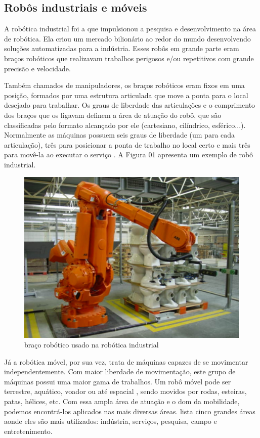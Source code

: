 \subsection{Robôs industriais e móveis}

A robótica industrial foi a que impulsionou a pesquisa e desenvolvimento na área de robótica. Ela criou um mercado bilionário ao redor do mundo desenvolvendo soluções automatizadas para a indústria. Esses robôs em grande parte eram braços robóticos que realizavam trabalhos perigosos e/ou repetitivos com grande precisão e velocidade. 

Também chamados de manipuladores, os braços robóticos eram fixos em uma posição, formados por uma estrutura articulada que move a ponta para o local desejado para trabalhar. Os graus de liberdade das articulações e o comprimento dos braços que os ligavam definem a área de atuação do robô, que são classificadas pelo formato alcançado por ele (cartesiano, cilíndrico, esférico...). Normalmente as máquinas possuem seis graus de liberdade (um para cada articulação), três para posicionar a ponta de trabalho no local certo e mais três para movê-la ao executar o serviço \cite{Abreu2001}. A Figura 01 apresenta um exemplo de robô industrial.

\begin{figure}[h]
	\centering
	\label{fig01}
		\includegraphics[keepaspectratio=true,scale=0.6]{figuras/1bracorobotico.jpg}
	\caption{braço robótico usado na robótica industrial \cite{IMG_ROB_IND_SITE}}
\end{figure}

Já a robótica móvel, por sua vez, trata de máquinas capazes de se movimentar independentemente. Com maior liberdade de movimentação, este grupo de máquinas possui uma maior gama de trabalhos. Um robô móvel pode ser terrestre, aquático, voador ou até espacial \cite{Vieira2005}, sendo movidos por rodas, esteiras, patas, hélices, etc. Com essa ampla área de atuação e o dom da mobilidade, podemos encontrá-los aplicados nas mais diversas áreas. \cite{Pereira2003} lista cinco grandes áreas aonde eles são mais utilizados: indústria, serviços, pesquisa, campo e entretenimento.

